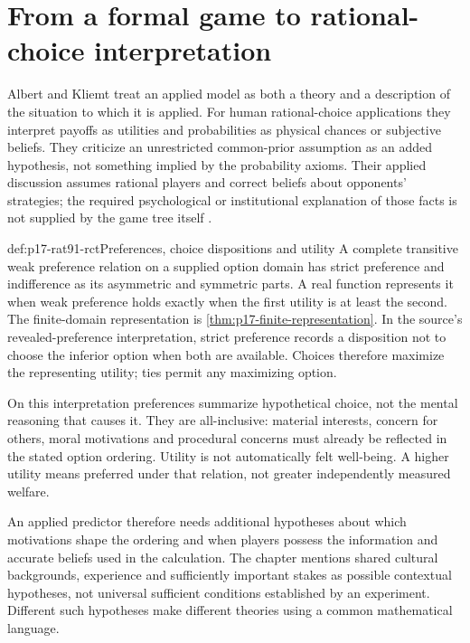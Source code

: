 \section{From a formal game to rational-choice interpretation}

Albert and Kliemt treat an applied model as both a theory and a
description of the situation to which it is applied. For human
rational-choice applications they interpret payoffs as utilities and
probabilities as physical chances or subjective beliefs. They criticize
an unrestricted common-prior assumption as an added hypothesis, not
something implied by the probability axioms. Their applied discussion
assumes rational players and correct beliefs about opponents' strategies;
the required psychological or institutional explanation of those facts
is not supplied by the game tree itself
\parencite[pp.~535--538]{AlbertKliemt2021ClassicalGameTheory}.

\begin{hbdefinition}{def:p17-rat91-rct}{Preferences, choice dispositions and utility}
A complete transitive weak preference relation on a supplied option
domain has strict preference and indifference as its asymmetric and
symmetric parts. A real function represents it when weak preference
holds exactly when the first utility is at least the second.
The finite-domain representation is \cref{thm:p17-finite-representation}.
In the source's revealed-preference interpretation, strict preference
records a disposition not to choose the inferior option when both
are available. Choices therefore maximize the representing utility;
ties permit any maximizing option.

On this interpretation preferences summarize hypothetical choice,
not the mental reasoning that causes it. They are all-inclusive:
material interests, concern for others, moral motivations and procedural
concerns must already be reflected in the stated option ordering.
Utility is not automatically felt well-being. A higher utility means
preferred under that relation, not greater independently measured welfare.
\end{hbdefinition}

An applied predictor therefore needs additional hypotheses about which
motivations shape the ordering and when players possess the information
and accurate beliefs used in the calculation. The chapter mentions
shared cultural backgrounds, experience and sufficiently important
stakes as possible contextual hypotheses, not universal sufficient
conditions established by an experiment. Different such hypotheses
make different theories using a common mathematical language.

